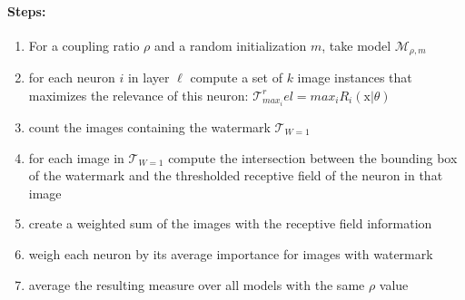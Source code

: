\paragraph{Steps:}
\begin{enumerate}
    \item For a coupling ratio $\rho$ and a random initialization $m$, take model $\mathcal{M}_{\rho, m}$
    \item for each neuron $i$ in layer $\ell$ compute a set of $k$ image instances that maximizes the relevance of this neuron: $\mathcal{T}_{max_i}^rel = max_i R_i(\mathrm{x} | \theta)$ 
    \item count the images containing the watermark $\mathcal{T}_{W=1}$
    \item for each image in $\mathcal{T}_{W=1}$ compute the intersection between the bounding box of the watermark and the thresholded receptive field of the neuron in that image
    \item create a weighted sum of the images with the receptive field information
    \item weigh each neuron by its average importance for images with watermark
    \item average the resulting measure over all models with the same $\rho$ value 
\end{enumerate}



